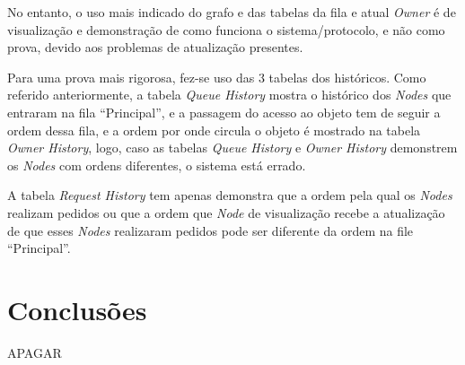 No entanto, o uso mais indicado do grafo e das tabelas da fila e atual \emph{Owner} é de visualização e demonstração de como funciona o sistema/protocolo, e não como prova, devido aos problemas de atualização presentes. 

Para uma prova mais rigorosa, fez-se uso das 3 tabelas dos históricos. 
Como referido anteriormente, a tabela \emph{Queue History} mostra o histórico dos \emph{Nodes} que entraram na fila ``Principal'', e a passagem do acesso ao objeto tem de seguir a ordem dessa fila, e a ordem por onde circula o objeto é mostrado na tabela \emph{Owner History}, logo, caso as tabelas \emph{Queue History} e \emph{Owner History} demonstrem os \emph{Nodes} com ordens diferentes, o sistema está errado.

A tabela \emph{Request History} tem apenas demonstra que a ordem pela qual os \emph{Nodes} realizam pedidos ou que a ordem que \emph{Node} de visualização recebe a atualização de que esses \emph{Nodes} realizaram pedidos pode ser diferente da ordem na file ``Principal''.




\section{Conclusões}
APAGAR
